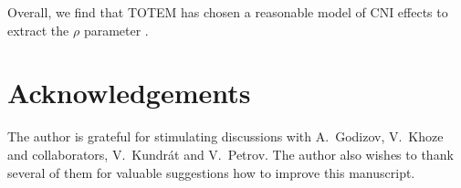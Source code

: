 \documentclass{appolb}
\begin{document}
Overall, we find that TOTEM has chosen a reasonable model of CNI effects to extract the $\rho$ parameter \cite{totem-13tev-rho}.




\section{Acknowledgements}

The author is grateful for stimulating discussions with A.~Godizov, V.~Khoze and collaborators, V.~Kundr\'at and V.~Petrov. The author also wishes to thank several of them for valuable suggestions how to improve this manuscript.


\def\journal#1#2#3#4{
	#1 #2 (#3) #4
}
\end{document}
